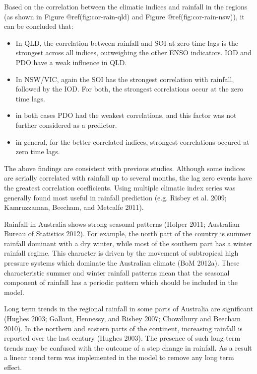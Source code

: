 \documentclass[fleqn,10pt,lineno]{wlpeerj} %
\begin{document}
Based on the correlation between the climatic indices and rainfall in
the regions (as shown in Figure @ref(fig:cor-rain-qld) and Figure
@ref(fig:cor-rain-nsw)), it can be concluded that:

\begin{itemize}
  \setlength{\itemsep}{0cm}
  \setlength{\parskip}{0cm}
  \item In QLD, the correlation between rainfall and SOI at zero time lags is the strongest across all indices, outweighing the other ENSO indicators. IOD and PDO have a weak influence in QLD.
  \item In NSW/VIC, again the SOI has the strongest correlation with rainfall, followed by the IOD. For both, the strongest correlations occur at the zero time lags. 
  \item in both cases PDO had the weakest correlations, and this factor was not further considered as a predictor.
  \item in general, for the better correlated indices, strongest correlations occured at zero time lags.
\end{itemize}

The above findings are consistent with previous studies. Although some
indices are serially correlated with rainfall up to several months, the
lag zero events have the greatest correlation coefficients. Using
multiple climatic index series was generally found most useful in
rainfall prediction (e.g. Risbey et al. 2009; Kamruzzaman, Beecham, and
Metcalfe 2011).

Rainfall in Australia shows strong seasonal patterns (Holper 2011;
Australian Bureau of Statistics 2012). For example, the north part of
the country is summer rainfall dominant with a dry winter, while most of
the southern part has a winter rainfall regime. This character is driven
by the movement of subtropical high pressure systems which dominate the
Australian climate (BoM 2012a). These characteristic summer and winter
rainfall patterns mean that the seasonal component of rainfall has a
periodic pattern which should be included in the model.

Long term trends in the regional rainfall in some parts of Australia are
significant (Hughes 2003; Gallant, Hennessy, and Risbey 2007; Chowdhury
and Beecham 2010). In the northern and eastern parts of the continent,
increasing rainfall is reported over the last century (Hughes 2003). The
presence of such long term trends may be confused with the outcome of a
step change in rainfall. As a result a linear trend term was implemented
in the model to remove any long term effect.
\end{document}

